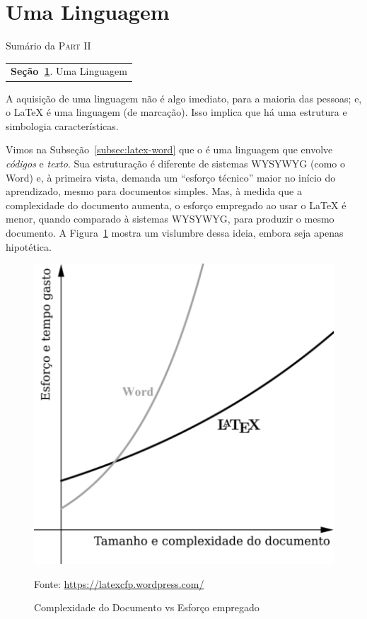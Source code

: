 \section{Uma Linguagem} %
\label{sec:aprendendo}

\begin{margintable}\vspace{.8in}\footnotesize
  \caption{Sumário da \textsc{Part II}}
  \medskip
  \begin{tabularx}{\marginparwidth}{|X}
    \textbf{\sffamily \textcolor{azulUFRB}{Seção}~\ref{sec:aprendendo}}.    {\sffamily Uma Linguagem} \\
  \end{tabularx}
\end{margintable}

A aquisição de uma linguagem não é algo imediato, para a maioria das pessoas; e,
o \LaTeX{} é uma linguagem (de marcação).
Isso implica que há uma \textsf{estrutura} e \textsf{simbologia} características.

Vimos na Subseção~\ref{subsec:latex-word} que o  é uma linguagem 
que envolve \textit{códigos} e \textit{texto}.
Sua estruturação é diferente de sistemas \textsf{WYSYWYG} (como o Word) e, à
primeira vista, demanda um ``esforço técnico'' maior no início do aprendizado, 
mesmo para documentos simples.
Mas, à medida que a complexidade do documento aumenta, o esforço empregado ao 
usar o \LaTeX{} é menor, quando comparado à sistemas \textsf{WYSYWYG}, para 
produzir o mesmo documento.
A Figura~\ref{fig:latex-vs-word} mostra um vislumbre dessa ideia, embora seja
apenas hipotética.

\begin{figure}[!htbp]
  \centering
  \caption{Complexidade do Documento vs Esforço empregado}
  \label{fig:latex-vs-word}
  \medskip
  \includegraphics[width = 0.6\linewidth]{figs/latex-vs-word.png}
  
  {\small \textsf{Fonte:} \url{https://latexcfp.wordpress.com/}}
\end{figure}


